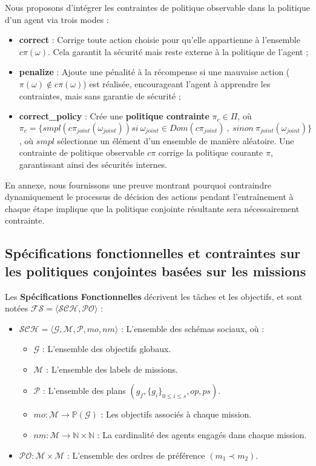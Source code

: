 \documentclass[sigconf,anonymous]{aamas}
\begin{document}
Nous proposons d'intégrer les contraintes de politique observable dans la politique d'un agent via trois modes :
\begin{itemize}
    \item \textbf{correct} : Corrige toute action choisie pour qu'elle appartienne à l'ensemble $c\pi(\omega)$. Cela garantit la sécurité mais reste externe à la politique de l'agent ;
    \item \textbf{penalize} : Ajoute une pénalité à la récompense si une mauvaise action ($\pi(\omega) \notin c\pi(\omega)$) est réalisée, encourageant l'agent à apprendre les contraintes, mais sans garantie de sécurité ;
    \item \textbf{correct\_policy} : Crée une \textbf{politique contrainte} $\pi_c \in \Pi$, où $\pi_c = \{smpl(c\pi_{joint}(\omega_{joint})) \allowbreak si \ \omega_{joint} \in Dom(c\pi_{joint}) \ \allowbreak, \ \allowbreak sinon \ \allowbreak \pi_{joint}(\omega_{joint})\}$, où $smpl$ sélectionne un élément d'un ensemble de manière aléatoire. Une contrainte de politique observable $c\pi$ corrige la politique courante $\pi$, garantissant ainsi des sécurités internes.
\end{itemize}

En annexe, nous fournissons une preuve montrant pourquoi contraindre dynamiquement le processus de décision des actions pendant l'entraînement à chaque étape implique que la politique conjointe résultante sera nécessairement contrainte.

\subsection{Spécifications fonctionnelles et contraintes sur les politiques conjointes basées sur les missions}

Les \textbf{Spécifications Fonctionnelles} décrivent les tâches et les objectifs, et sont notées $\mathcal{FS} = \langle \mathcal{SCH}, \mathcal{PO} \rangle$ :

\begin{itemize}
    \item $\mathcal{SCH} = \langle \mathcal{G}, \mathcal{M}, \mathcal{P}, mo, nm \rangle$ : L'ensemble des schémas sociaux, où :
          \begin{itemize}
              \item $\mathcal{G}$ : L'ensemble des objectifs globaux.
              \item $\mathcal{M}$ : L'ensemble des labels de missions.
              \item $\mathcal{P}$ : L'ensemble des plans $(g_f, \{g_i\}_{0 \leq i \leq s}, op, ps)$.
              \item $mo: \mathcal{M} \rightarrow \mathbb{P}(\mathcal{G})$ : Les objectifs associés à chaque mission.
              \item $nm: \mathcal{M} \rightarrow \mathbb{N} \times \mathbb{N}$ : La cardinalité des agents engagés dans chaque mission.
          \end{itemize}
    \item $\mathcal{PO}: \mathcal{M} \times \mathcal{M}$ : L'ensemble des ordres de préférence $(m_1 \prec m_2)$.
\end{itemize}
\end{document}
